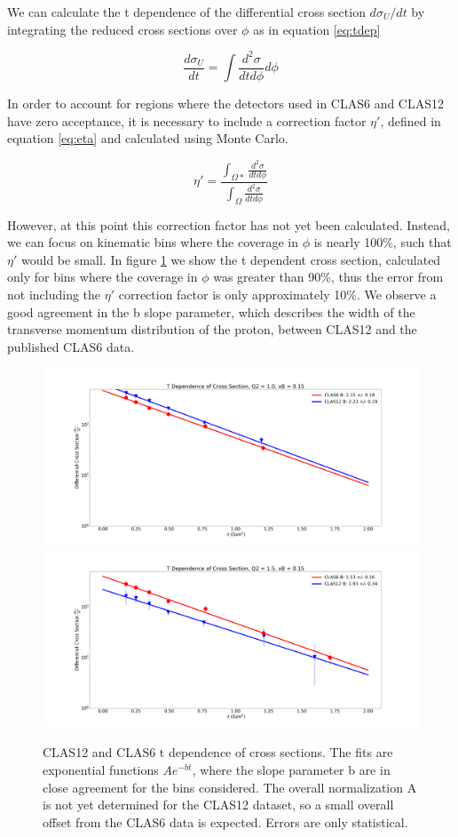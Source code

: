 
We can calculate the t dependence of the differential cross section $d\sigma_U/dt$ by integrating the reduced cross sections over $\phi$ as in equation \ref{eq:tdep}

 \begin{equation}\label{eq:tdep}
    \frac{d\sigma_U}{dt} = \int \frac{d^2\sigma}{dtd\phi} d\phi
\end{equation}

In order to account for regions where the detectors used in CLAS6 and CLAS12 have zero acceptance, it is necessary to include a correction factor $\eta'$, defined in equation \ref{eq:eta} and calculated using Monte Carlo. 

 \begin{equation}\label{eq:eta}
    \eta' = \frac{\int_{\Omega*} \frac{d^2\sigma}{dtd\phi} }{\int_{\Omega} \frac{d^2\sigma}{dtd\phi}}
\end{equation}

However, at this point this correction factor has not yet been calculated. Instead, we can focus on kinematic bins where the coverage in $\phi$ is nearly 100\%, such that $\eta'$ would be small. In figure \ref{fig:tdep} we show the t dependent cross section, calculated only for bins where the coverage in $\phi$ was greater than 90\%, thus the error from not including the $\eta'$ correction factor is only approximately 10\%. We observe a good agreement in the b slope parameter, which describes the width of the transverse momentum distribution of the proton, between CLAS12 and the published CLAS6 data.


\begin{figure}[hbt]
	\centering
	\includegraphics[page=125,width=0.45\linewidth]{Chapters/Ch5-Further/t_dependence/pics/fig_1.0_0.15.png}
	\includegraphics[page=130,width=0.45\linewidth]{Chapters/Ch5-Further/t_dependence/pics/fig_1.5_0.15.png}

	\caption{CLAS12 and CLAS6 t dependence of cross sections. The fits are exponential functions $Ae^{-bt}$, where the slope parameter b are in close agreement for the bins considered. The overall normalization A is not yet determined for the CLAS12 dataset, so a small overall offset from the CLAS6 data is expected. Errors are only statistical.}
	\label{fig:tdep}
\end{figure}